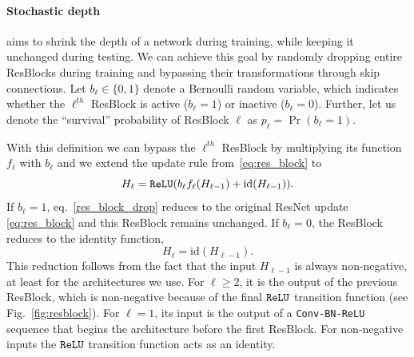 \paragraph{\textbf{Stochastic depth}} aims to shrink the depth of a network during training, while keeping it unchanged during testing. We can achieve this goal by randomly dropping entire ResBlocks during training and bypassing their transformations through skip connections.
Let $b_\ell\in\{0,1\}$ denote a Bernoulli random variable, which indicates whether the $\ell^{th}$ ResBlock is active ($b_\ell=1$) or inactive ($b_\ell=0$). Further, let us denote the ``survival'' probability of ResBlock $\ell$ as $p_\ell=\Pr(b_\ell=1)$.

With this definition we can bypass the $\ell^{th}$ ResBlock by multiplying its function $f_\ell$ with $b_\ell$ and we extend the update rule from~\eqref{eq:res_block} to
\begin{equation}
\label{res_block_drop}
 H_\ell = {\tt ReLU} (b_\ell f_\ell(H_{\ell-1}) +  \text{id}(H_{\ell-1})).
\end{equation}
If $b_\ell\!=\!1$, eq.~\eqref{res_block_drop} reduces to the original ResNet update \eqref{eq:res_block} and this ResBlock remains unchanged.
If $b_\ell\!=\!0$, the ResBlock reduces to the identity function,
\begin{equation}
 H_\ell = \text{id}(H_{\ell-1}).
\end{equation}
This reduction follows from the fact that the input $H_{\ell-1}$ is always non-negative, at least for the architectures we use. For $\ell\geq 2$, it is the output of the previous ResBlock, which is non-negative because of the final ${\tt ReLU}$ transition function (see Fig.~\ref{fig:resblock}). For $\ell\!=\!1$, its input is the output of a {\tt Conv-BN-ReLU} sequence that begins the architecture before the first ResBlock. For non-negative inputs the ${\tt ReLU}$ transition function acts as an identity.

